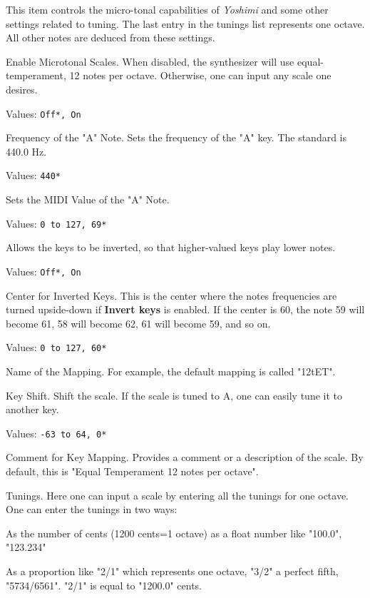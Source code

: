   This item controls the micro-tonal capabilities of \textsl{Yoshimi} and
   some other settings related to tuning. 
   The last entry in the tunings list represents one octave.
   All other notes are deduced from these settings.

   \setcounter{ItemCounter}{0}      %

   Enable Microtonal Scales.
   When disabled, the synthesizer will use equal-temperament, 12 notes per
   octave.  Otherwise, one can input any scale one desires.

   Values: \texttt{Off*, On}

   Frequency of the "A" Note.
   Sets the frequency of the "A" key. The standard is 440.0 Hz.

   Values: \texttt{440*}

   Sets the MIDI Value of the "A" Note.

   Values: \texttt{0 to 127, 69*}

   Allows the keys to be inverted, so that higher-valued keys play lower
   notes.

   Values: \texttt{Off*, On}

   Center for Inverted Keys.
   This is the center where the notes frequencies are turned upside-down if
   \textbf{Invert keys} is enabled.
   If the center is 60, the note 59 will become 61, 58 will become 62, 61
   will become 59, and so on.

   Values: \texttt{0 to 127, 60*}

   Name of the Mapping.
   For example, the default mapping is called "12tET".

   Key Shift.
   Shift the scale. If the scale is tuned to A, one can easily tune it to
   another key.

   Values: \texttt{-63 to 64, 0*}

   Comment for Key Mapping.
   Provides a comment or a description of the scale.
   By default, this is "Equal Temperament 12 notes per octave".

   Tunings.
   Here one can input a scale by entering all the tunings for one octave. 
   One can enter the tunings in two ways: 

   \begin{enumber}
      \item As the number of cents (1200 cents=1 octave) as a float number
         like "100.0", "123.234"
      \item As a proportion like "2/1" which represents one octave, "3/2" a
         perfect fifth, "5734/6561".  "2/1" is equal to "1200.0" cents.
   \end{enumber}

